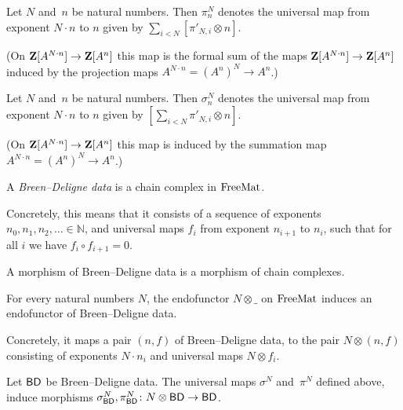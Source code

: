 \begin{definition}
  \label{proj}
  \leanok
  Let $N$ and~$n$ be natural numbers.
  Then $\pi^N_n$ denotes the universal map from exponent $N \cdot n$ to $n$
  given by $\sum_{i < N} [\pi'_{N,i} \otimes n]$.

  (On $\mathbf{Z}[A^{N \cdot n}] \to \mathbf{Z}[A^n]$ this map is
  the formal sum of the maps $\mathbf{Z}[A^{N \cdot n}] \to \mathbf{Z}[A^n]$
  induced by the projection maps $A^{N \cdot n} = (A^n)^N \to A^n$.)
\end{definition}

\begin{definition}
  \label{sum}
  \leanok
  Let $N$ and~$n$ be natural numbers.
  Then $\sigma^N_n$ denotes the universal map from exponent $N \cdot n$ to $n$
  given by $[\sum_{i < N} \pi'_{N,i} \otimes n]$.

  (On $\mathbf{Z}[A^{N \cdot n}] \to \mathbf{Z}[A^n]$ this map is
  induced by the summation map $A^{N \cdot n} = (A^n)^N \to A^n$.)
\end{definition}

\begin{definition}
  \label{BD_data}
  \leanok
  A \emph{Breen--Deligne data} is a chain complex in $\textnormal{FreeMat}$.

  Concretely, this means that it
  consists of a sequence of exponents $n_0, n_1, n_2, \dots \in \mathbb N$,
  and universal maps $f_i$ from exponent $n_{i+1}$ to $n_i$,
  such that for all $i$ we have $f_i \circ f_{i+1} = 0$.

  A morphism of Breen--Deligne data is a morphism of chain complexes.
\end{definition}

\begin{definition}
  \label{BD_mul}
  \leanok
  For every natural numbers $N$, the endofunctor $N \otimes \_$ on $\textnormal{FreeMat}$
  induces an endofunctor of Breen--Deligne data.

  Concretely, it maps a pair $(n, f)$ of Breen--Deligne data,
  to the pair $N \otimes (n,f)$ consisting of exponents $N \cdot n_i$
  and universal maps $N \otimes f_i$.
\end{definition}

Let $\mathsf{BD}$ be Breen--Deligne data.
The universal maps $\sigma^N$ and~$\pi^N$ defined above,
induce morphisms $\sigma^N_{\mathsf{BD}},\pi^N_{\mathsf{BD}} \colon N \otimes \mathsf{BD} \to \mathsf{BD}$.

